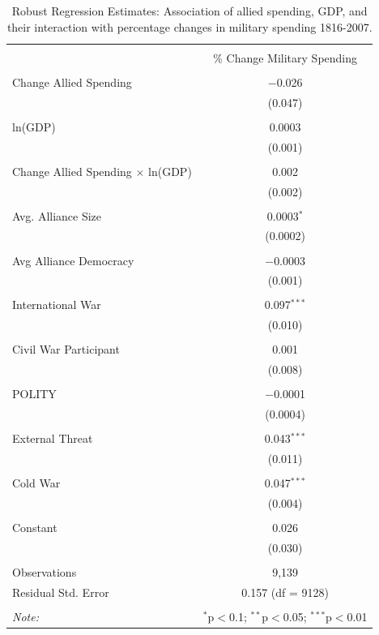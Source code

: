 \documentclass[12pt]{article}
\begin{document}
\begin{table}[!htbp] \centering 
\begin{tabular}{@{\extracolsep{5pt}}lc} 
\\[-1.8ex]\hline 
\hline \\[-1.8ex] 
  & \% Change Military Spending \\ 
\hline \\[-1.8ex] 
 Change Allied Spending & $-$0.026 \\ 
  & (0.047) \\ 
  & \\ 
 ln(GDP) & 0.0003 \\ 
  & (0.001) \\ 
  & \\ 
 Change Allied Spending $\times$ ln(GDP) & 0.002 \\ 
  & (0.002) \\ 
  & \\ 
 Avg. Alliance Size & 0.0003$^{*}$ \\ 
  & (0.0002) \\ 
  & \\ 
 Avg Alliance Democracy & $-$0.0003 \\ 
  & (0.001) \\ 
  & \\ 
 International War & 0.097$^{***}$ \\ 
  & (0.010) \\ 
  & \\ 
 Civil War Participant & 0.001 \\ 
  & (0.008) \\ 
  & \\ 
 POLITY & $-$0.0001 \\ 
  & (0.0004) \\ 
  & \\ 
 External Threat & 0.043$^{***}$ \\ 
  & (0.011) \\ 
  & \\ 
 Cold War & 0.047$^{***}$ \\ 
  & (0.004) \\ 
  & \\ 
 Constant & 0.026 \\ 
  & (0.030) \\ 
\hline \\[-1.8ex] 
Observations & 9,139 \\ 
Residual Std. Error & 0.157 (df = 9128) \\ 
\hline 
\hline \\[-1.8ex] 
\textit{Note:}  & \multicolumn{1}{r}{$^{*}$p$<$0.1; $^{**}$p$<$0.05; $^{***}$p$<$0.01} \\ 
\end{tabular} 
\caption{Robust Regression Estimates: Association of allied spending, GDP, and their interaction with percentage changes in military spending 1816-2007.}
\label{tab:rreg-res}
\end{table}
\end{document}
